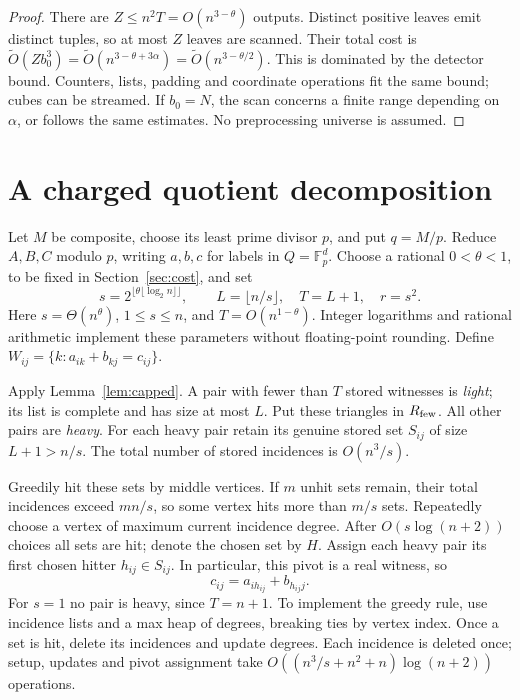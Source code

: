\documentclass[manuscript,screen,nonacm,11pt]{acmart}
\newcommand{\F}{\mathbb F}
\newcommand{\Ot}{\widetilde O}
\begin{document}
\begin{proof}
There are $Z\le n^2T=O(n^{3-\theta})$ outputs. Distinct positive leaves
emit distinct tuples, so at most $Z$ leaves are scanned. Their total cost
is $\Ot(Zb_0^3)=\Ot(n^{3-\theta+3\alpha})
=\Ot(n^{3-\theta/2})$. This is dominated by the detector bound. Counters,
lists, padding and coordinate operations fit the same bound; cubes can be
streamed. If $b_0=N$, the scan concerns a finite range depending on $\alpha$,
or follows the same estimates. No preprocessing universe is assumed.
\end{proof}

\section{A charged quotient decomposition}\label{sec:pieces}

Let $M$ be composite, choose its least prime divisor $p$, and put $q=M/p$.
Reduce $A,B,C$ modulo $p$, writing $a,b,c$ for labels in $Q=\F_p^d$.
Choose a rational $0<\theta<1$, to be fixed in Section~\ref{sec:cost}, and set
\begin{equation}\label{eq:params}
 s=2^{\lfloor\theta\lfloor\log_2 n\rfloor\rfloor},\qquad
 L=\lfloor n/s\rfloor,\quad T=L+1,\quad r=s^2.
\end{equation}
Here $s=\Theta(n^\theta)$, $1\le s\le n$, and $T=O(n^{1-\theta})$.
Integer logarithms and rational arithmetic implement these parameters
without floating-point rounding. Define
$W_{ij}=\{k:a_{ik}+b_{kj}=c_{ij}\}$.

Apply Lemma~\ref{lem:capped}. A pair with fewer than $T$ stored witnesses
is \emph{light}; its list is complete and has size at most $L$. Put these
triangles in $R_{\rm few}$. All other pairs are \emph{heavy}. For each
heavy pair retain its genuine stored set $S_{ij}$ of size $L+1>n/s$.
The total number of stored incidences is $O(n^3/s)$.

Greedily hit these sets by middle vertices. If $m$ unhit sets remain,
their total incidences exceed $mn/s$, so some vertex hits more than $m/s$
sets. Repeatedly choose a vertex of maximum current incidence degree.
After $O(s\log(n+2))$ choices all sets are hit; denote the chosen set by
$H$. Assign each heavy pair its first chosen hitter $h_{ij}\in S_{ij}$.
In particular, this pivot is a real witness, so
\begin{equation}\label{eq:pivot}
 c_{ij}=a_{i h_{ij}}+b_{h_{ij}j}.
\end{equation}
For $s=1$ no pair is heavy, since $T=n+1$.
To implement the greedy rule, use incidence lists and a max heap of degrees,
breaking ties by vertex index. Once a set is hit, delete its incidences and
update degrees. Each incidence is deleted once; setup, updates and pivot
assignment take $O((n^3/s+n^2+n)\log(n+2))$ operations.
\end{document}

